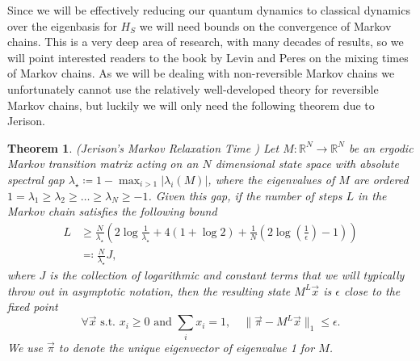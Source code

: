 \documentclass{article}
\newtheorem{theorem}{Theorem}
\newcommand{\norm}[1]{\| #1 \|}
\begin{document}
Since we will be effectively reducing our quantum dynamics to classical dynamics over the eigenbasis for $H_S$ we will need bounds on the convergence of Markov chains. This is a very deep area of research, with many decades of results, so we will point interested readers to the book by Levin and Peres \cite{levin2017markov} on the mixing times of Markov chains. As we will be dealing with non-reversible Markov chains we unfortunately cannot use the relatively well-developed theory for reversible Markov chains, but luckily we will only need the following theorem due to Jerison.
\begin{theorem}(Jerison's Markov Relaxation Time \cite{jerison2013general}) \label{thm:markov_chain_bound}
    Let $M : \mathbb{R}^{N} \to  \mathbb{R}^{N}$ be an ergodic Markov transition matrix acting on an $N$ dimensional state space with absolute spectral gap $\lambda_{\star} \coloneqq 1 - \max_{i > 1} |\lambda_i(M)|$, where the eigenvalues of $M$ are ordered $1 = \lambda_1 \ge \lambda_2 \ge \ldots \ge \lambda_N \geq -1$. Given this gap, if the number of steps $L$ in the Markov chain satisfies the following bound
    \begin{align}
        L &\ge \frac{N}{\lambda_{\star}} \left( 2\log \frac{1}{\lambda_{\star}} + 4(1 + \log 2) +  \frac{1}{N} (2 \log \left( \frac{1}{\epsilon} \right) - 1) \right) \\
        &\eqqcolon \frac{N}{\lambda_\star} J,
    \end{align}
    where $J$ is the collection of logarithmic and constant terms that we will typically throw out in asymptotic notation, then the resulting state $M^L \vec{x}$ is $\epsilon$ close to the fixed point
    \begin{equation}
        \forall \vec{x} \text{ s.t. } x_i \ge 0 \text{ and } \sum_i x_i = 1, \quad \norm{\vec{\pi} - M^L \vec{x}}_1 \le \epsilon.
    \end{equation}
    We use $\vec{\pi}$ to denote the unique eigenvector of eigenvalue 1 for $M$.
\end{theorem}
\end{document}
